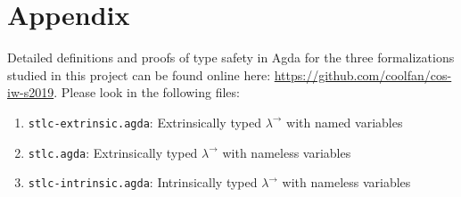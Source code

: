 \documentclass[12pt, letterpaper]{article}
\begin{document}
\section*{Appendix}
Detailed definitions and proofs of type safety in Agda for the three formalizations studied in this project can be found online here:
\url{https://github.com/coolfan/cos-iw-s2019}. Please look in the following files:
\begin{enumerate}
	\item \texttt{stlc-extrinsic.agda}: Extrinsically typed $\lambda^{\to}$ with named variables
	\item \texttt{stlc.agda}: Extrinsically typed $\lambda^{\to}$ with nameless variables
	\item \texttt{stlc-intrinsic.agda}: Intrinsically typed $\lambda^{\to}$ with nameless variables
\end{enumerate}
\end{document}
